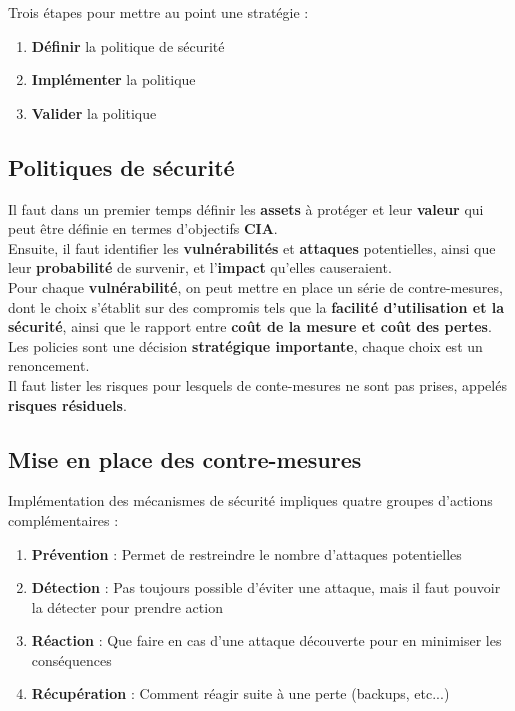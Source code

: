 \documentclass{report}
\begin{document}
		Trois étapes pour mettre au point une stratégie : \\

		\begin{enumerate}
			\item \textbf{Définir} la politique de sécurité
			\item \textbf{Implémenter} la politique
			\item \textbf{Valider} la politique\\
		\end{enumerate}

		\subsection{Politiques de sécurité}

			Il faut dans un premier temps définir les \textbf{assets} à protéger et leur \textbf{valeur} qui peut être définie en termes d'objectifs \textbf{CIA}.\\

			Ensuite, il faut identifier les \textbf{vulnérabilités} et \textbf{attaques} potentielles, ainsi que leur \textbf{probabilité} de survenir, et l'\textbf{impact} qu'elles causeraient.\\

			Pour chaque \textbf{vulnérabilité}, on peut mettre en place un série de contre-mesures, dont le choix s'établit sur des compromis tels que la \textbf{facilité d'utilisation et la sécurité}, ainsi que le rapport entre \textbf{coût de la mesure et coût des pertes}.\\

			Les policies sont une décision \textbf{stratégique importante}, chaque choix est un renoncement.\\
			Il faut lister les risques pour lesquels de conte-mesures ne sont pas prises, appelés \textbf{risques résiduels}.\\

		\subsection{Mise en place des contre-mesures}

			Implémentation des mécanismes de sécurité impliques quatre groupes d'actions complémentaires : \\

			\begin{enumerate}
				\item \textbf{Prévention} : Permet de restreindre le nombre d'attaques potentielles
				\item \textbf{Détection} : Pas toujours possible d'éviter une attaque, mais il faut pouvoir la détecter pour prendre action
				\item \textbf{Réaction} : Que faire en cas d'une attaque découverte pour en minimiser les conséquences
				\item \textbf{Récupération} : Comment réagir suite à une perte (backups, etc...)\\
			\end{enumerate}
\end{document}
